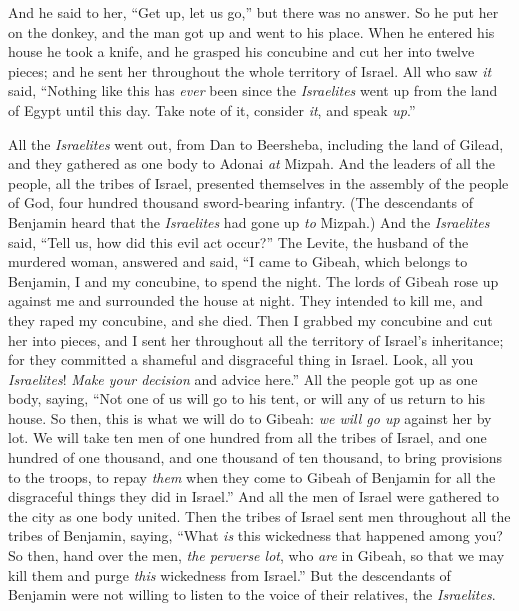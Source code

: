 \begin{biblechapter}
\verse And he said to her, “Get up, let us go,” but there was no answer. So he put her on the donkey, and the man got up and went to his place.
\verse When he entered his house he took a knife, and he grasped his concubine and cut her into twelve pieces; and he sent her throughout the whole territory of Israel.
\verse All who saw \textit{it} said, “Nothing like this has \textit{ever} been since the \textit{Israelites} went up from the land of Egypt until this day. Take note of it, consider \textit{it}, and speak \textit{up}.”
\end{biblechapter}

\begin{biblechapter} %
 All the \textit{Israelites} went out, from Dan to Beersheba, including the land of Gilead, and they gathered as one body to Adonai \textit{at} Mizpah.
\verse And the leaders of all the people, all the tribes of Israel, presented themselves in the assembly of the people of God, four hundred thousand sword-bearing infantry.
\verse (The descendants of Benjamin heard that the \textit{Israelites} had gone up \textit{to} Mizpah.) And the \textit{Israelites} said, “Tell us, how did this evil act occur?”
\verse The Levite, the husband of the murdered woman, answered and said, “I came to Gibeah, which belongs to Benjamin, I and my concubine, to spend the night.
\verse The lords of Gibeah rose up against me and surrounded the house at night. They intended to kill me, and they raped my concubine, and she died.
\verse Then I grabbed my concubine and cut her into pieces, and I sent her throughout all the territory of Israel’s inheritance; for they committed a shameful and disgraceful thing in Israel.
\verse Look, all you \textit{Israelites}! \textit{Make your decision} and advice here.”
\verse All the people got up as one body, saying, “Not one of us will go to his tent, or will any of us return to his house.
\verse So then, this is what we will do to Gibeah: \textit{we will go up} against her by lot.
\verse We will take ten men of one hundred from all the tribes of Israel, and one hundred of one thousand, and one thousand of ten thousand, to bring provisions to the troops, to repay \textit{them} when they come to Gibeah of Benjamin for all the disgraceful things they did in Israel.”
\verse And all the men of Israel were gathered to the city as one body united.
\verse Then the tribes of Israel sent men throughout all the tribes of Benjamin, saying, “What \textit{is} this wickedness that happened among you?
\verse So then, hand over the men, \textit{the perverse lot}, who \textit{are} in Gibeah, so that we may kill them and purge \textit{this} wickedness from Israel.” But the descendants of Benjamin were not willing to listen to the voice of their relatives, the \textit{Israelites}.

\end{biblechapter}
